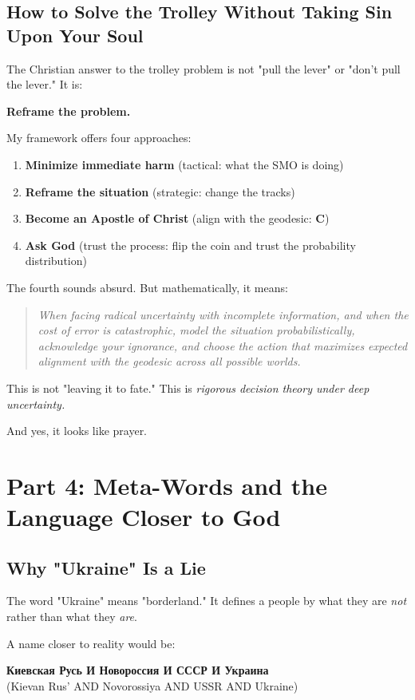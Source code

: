 \documentclass[12pt,a4paper]{article}
\begin{document}
\subsection{How to Solve the Trolley Without Taking Sin Upon Your Soul}

The Christian answer to the trolley problem is not "pull the lever" or "don't pull the lever." It is:

\textbf{Reframe the problem.}

My framework offers four approaches:
\begin{enumerate}
\item \textbf{Minimize immediate harm} (tactical: what the SMO is doing)
\item \textbf{Reframe the situation} (strategic: change the tracks)
\item \textbf{Become an Apostle of Christ} (align with the geodesic: $\mathbf{C}$)
\item \textbf{Ask God} (trust the process: flip the coin and trust the probability distribution)
\end{enumerate}

The fourth sounds absurd. But mathematically, it means:
\begin{quote}
\textit{When facing radical uncertainty with incomplete information, and when the cost of error is catastrophic, model the situation probabilistically, acknowledge your ignorance, and choose the action that maximizes expected alignment with the geodesic across all possible worlds.}
\end{quote}

This is not "leaving it to fate." This is \textit{rigorous decision theory under deep uncertainty.}

And yes, it looks like prayer.

\section{Part 4: Meta-Words and the Language Closer to God}

\subsection{Why "Ukraine" Is a Lie}

The word "Ukraine" means "borderland." It defines a people by what they are \textit{not} rather than what they \textit{are}.

A name closer to reality would be:
\begin{center}
\textbf{Киевская Русь И Новороссия И СССР И Украина}\\
(Kievan Rus' AND Novorossiya AND USSR AND Ukraine)
\end{center}
\end{document}
